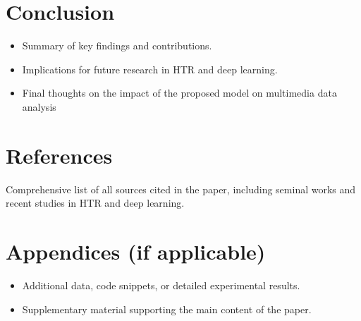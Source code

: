 \documentclass{article}
\begin{document}
\section{Conclusion}
    \begin{itemize}
        \item Summary of key findings and contributions.
        \item Implications for future research in HTR and deep learning.
        \item Final thoughts on the impact of the proposed model on multimedia data analysis
    \end{itemize}

\section{References}
Comprehensive list of all sources cited in the paper, including seminal works and recent studies in HTR and deep learning.

\section{Appendices (if applicable)}
    \begin{itemize}
        \item Additional data, code snippets, or detailed experimental results.
        \item Supplementary material supporting the main content of the paper.
    \end{itemize}










\







\end{document}
